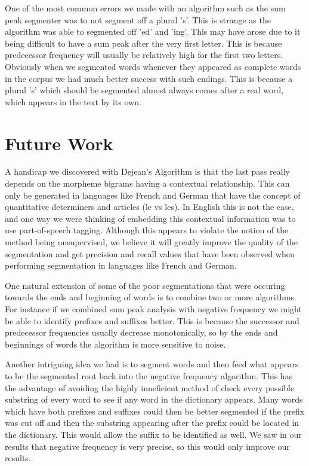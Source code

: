 \documentclass[11pt]{article}
\begin{document}
One of the most common errors we made with an algorithm such as the sum peak
segmenter was to not segment off a plural 's'. This is strange as the
algorithm was able to segmented off 'ed' and 'ing'. This may have arose due
to it being difficult to have a sum peak after the very first letter. This is
because predecessor frequency will usually be relatively high for the first 
two letters. Obviously when we segmented words whenever they appeared as
complete words in the corpus we had much better success with such endings.
This is because a plural 's' which should be segmented almost always comes after
a real word, which appears in the text by its own. 

\section{Future Work}
A handicap we discovered with Dejean's Algorithm is that the last pass really
depends on the morpheme bigrams having a contextual relationship. This can
only be generated in languages like French and German that have the concept
of quantitative determiners and articles (le vs les). In English this is not
the case, and one way we were thinking of embedding this contextual
information was to use part-of-speech tagging. Although this appears to violate
the notion of the method being unsupervised, we believe it will greatly 
improve the quality of the segmentation and get precision and recall values 
that have been observed when performing segmentation in languages like French
and German.

One natural extension of some of the poor segmentations that were occuring
towards the ends and beginning of words is to combine two or more algorithms.
For instance if we combined sum peak analysis with negative frequency we might
be able to identify prefixes and suffixes better. This is because the
successor and predecessor frequencies usually decrease monotonically, so by
the ends and beginnings of words the algorithm is more sensitive to noise.

Another intriguing idea we had is to segment words and then feed what appears
to be the segmented root back into the negative frequency algorithm. This has
the advantage of avoiding the highly inneficient method of check every
possible substring of every word to see if any word in the dictionary appears.
Many words which have both prefixes and suffixes could then be better
segmented if the prefix was cut off and then the substring appearing after
the prefix could be located in the dictionary. This would allow the suffix to
be identified as well. We saw in our results that negative frequency is very
precise, so this would only improve our results.
\end{document}
